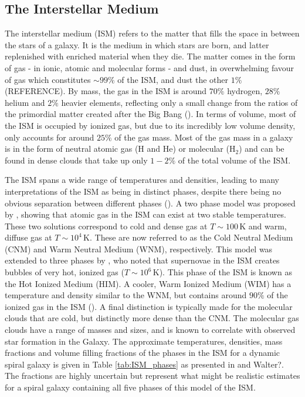 \subsection{The Interstellar Medium}

The interstellar medium (ISM) refers to the matter that fills the space in between the stars of a galaxy. It is the medium in which stars are born, and latter replenished with enriched material when they die. The matter comes in the form of gas - in ionic, atomic and molecular forms - and dust, in overwhelming favour of gas which constitutes $\sim99\%$ of the ISM, and dust the other $1\%$ ({\color{red}REFERENCE}). By mass, the gas in the ISM is around $70\%$ hydrogen, $28\%$ helium and $2\%$ heavier elements, reflecting only a small change from the ratios of the primordial matter created after the Big Bang (\citealt{Klessen_2016}). In terms of volume, most of the ISM is occupied by ionized gas, but due to its incredibly low volume density, only accounts for around $25\%$ of the gas mass. Most of the gas mass in a galaxy is in the form of neutral atomic gas (H and He) or molecular (H$_2$) and can be found in dense clouds that take up only $1-2\%$ of the total volume of the ISM.

The ISM spans a wide range of temperatures and densities, leading to many interpretations of the ISM as being in distinct phases, despite there being no obvious separation between different phases (\citealt{Cox_2005}). A two phase model was proposed by \citealt{Field_1969}, showing that atomic gas in the ISM can exist at two stable temperatures. These two solutions correspond to cold and dense gas at $T\sim100\,$K and warm, diffuse gas at $T\sim10^4\,$K. These are now referred to as the Cold Neutral Medium (CNM) and Warm Neutral Medium (WNM), respectively. This model was extended to three phases by \citealt{McKee_1977}, who noted that supernovae in the ISM creates bubbles of very hot, ionized gas ($T\sim10^6\,$K). This phase of the ISM is known as the Hot Ionized Medium (HIM). A cooler, Warm Ionized Medium (WIM) has a temperature and density similar to the WNM, but contains around $90\%$ of the ionized gas in the ISM (\citealt{Haffner_2009}). A final distinction is typically made for the molecular clouds that are cold, but distinctly more dense than the CNM. The molecular gas clouds have a range of masses and sizes, and is known to correlate with observed star formation in the Galaxy. The approximate temperatures, densities, mass fractions and volume filling fractions of the phases in the ISM for a dynamic spiral galaxy is given in Table \ref{tab:ISM_phases} as presented in \citealt{Ferriere_2001} and {\color{red}Walter?}. The fractions are highly uncertain but represent what might be realistic estimates for a spiral galaxy containing all five phases of this model of the ISM.

